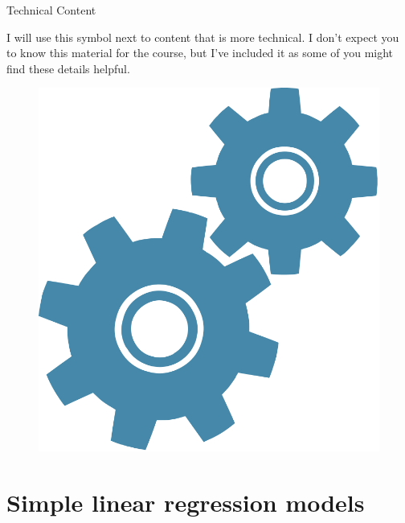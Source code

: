 \documentclass[10pt,t]{beamer}
\begin{document}
\begin{frame}{Technical Content}
	
I will use this symbol next to content that is more technical. I don't expect you to know this material for the course, but I've included it as some of you might find these details helpful.
\smallskip
\begin{figure}
	\centering
	\includegraphics[scale=0.15]{figures/technical}
\end{figure}

\end{frame}


\section{Simple linear regression models}
\end{document}
